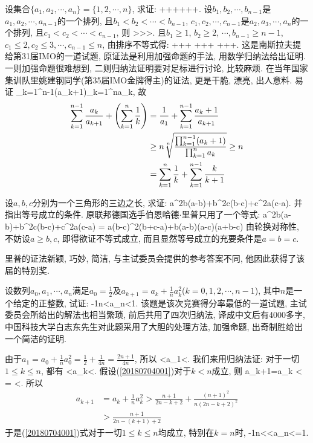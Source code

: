 设集合$\{a_1,a_2,\cdots,a_n\}=\{1,2,\cdots,n\}$, 求证:
\bee
{}++\cdots+\le{}++\cdots+.
\eee
\eq
\ba
设$b_1,b_2,\cdots,b_{n-1}$是$a_1,a_2,\cdots,a_{n-1}$的一个排列, 且$b_1<b_2<\cdots<b_{n-1}$, 
$c_1,c_2,\cdots,c_{n-1}$是$a_2,a_3,\cdots,a_{n}$的一个排列, 且$c_1<c_2<\cdots<c_{n-1}$, 则
\bee
{}>>\cdots>.
\eee
且$b_1\ge1$, $b_2\ge2$, $\cdots,b_{n-1}\ge n-1$, $c_1\le 2,c_2\le3,\cdots,c_{n-1}\le n$,
由排序不等式得:
\bee
{}++\cdots+
  \ge {}++\cdots+
  \ge {}++\cdots+.
\eee
这是南斯拉夫提给第31届IMO的一道试题, 原证法是利用加强命题的手法, 用数学归纳法给出证明.
一则加强命题很难想到, 二则归纳法证明要对足标进行讨论, 比较麻烦. 在当年国家集训队里姚建钢同学(第35届IMO金牌得主)的证法,
更是干脆, 漂亮, 出人意料.
\ea
\ba
易证
\bee
\prod_{k=1}^{n-1}(a_k+1)\ge\prod_{k=1}^na_k,
\eee
故
\begin{align*}
 \sum_{k=1}^{n-1}\frac{a_k}{a_{k+1}}+\left(\sum_{k=1}^n\frac1k\right)
  &=\frac{1}{a_1}+\sum_{k=1}^{n-1}\frac{a_k+1}{a_{k+1}}\\
  &\ge n \sqrt[n]{\frac{\prod_{k=1}^{n-1}(a_k+1)}{\prod_{k=1}^na_k}}\ge n\\
  &=\sum_{k=1}^{n}\frac{1}{k}+\sum_{k=1}^{n-1}\frac{k}{k+1}
\end{align*}

\ea

设$a,b,c$分别为一个三角形的三边之长, 求证:
\bee
a^2b(a-b)+b^2c(b-c)+c^2a(c-a).
\eee
并指出等号成立的条件.
\eq
\ba
原联邦德国选手伯恩哈德$\cdot$里普只用了一个等式:
\bee
a^2b(a-b)+b^2c(b-c)+c^2a(c-a)
  = a(b-c)^2(b+c-a)+b(a-b)(a-c)(a+b-c)
\eee
由轮换对称性, 不妨设$a\ge b, c$, 即得欲证不等式成立, 而且显然等号成立的充要条件是$a=b=c$.

里普的证法新颖, 巧妙, 简洁, 与主试委员会提供的参考答案不同, 他因此获得了该届的特别奖.
\ea

设数列$a_0,a_1,\cdots,a_n$满足$a_0=\frac12$及$a_{k+1}=a_k+\frac1na_k^2$($k=0,1,2,\cdots,n-1$),
其中$n$是一个给定的正整数, 试证:
-\frac1n<a_n<1.
\eee
\eq
\ba
该题是该次竞赛得分率最低的一道试题, 主试委员会所给出的解法也相当繁琐, 前后共用了四次归纳法, 译成中文后有4000多字,
中国科技大学白志东先生对此题采用了大胆的处理方法, 加强命题, 出奇制胜给出一个简洁的证明.

由于$a_1=a_0+\frac1na_0^2=\frac12+\frac1{4n}=\frac{2n+1}{4n}$, 所以
\bee
{}<a_1<.
\eee
我们来用归纳法证: 对于一切$1\le k\le n$, 都有
\be\label{20180704001}
<a_k<.
\ee
假设(\ref{20180704001})对于$k<n$成立, 则
\bee
a_{k+1}=a_k
  <
  =
  <.
\eee
所以
\begin{align*}
 a_{k+1} & = a_k+\frac1na_k^2>\frac{n+1}{2n-k+2}+\frac{(n+1)^2}{n(2n-k+2)^2}\\
  &>\frac{n+1}{2n-(k+1)+2}
\end{align*}
于是(\ref{20180704001})式对于一切$1\le k\le n$均成立, 特别在$k=n$时,
-\frac1n<<a_n<=1.
\eee

